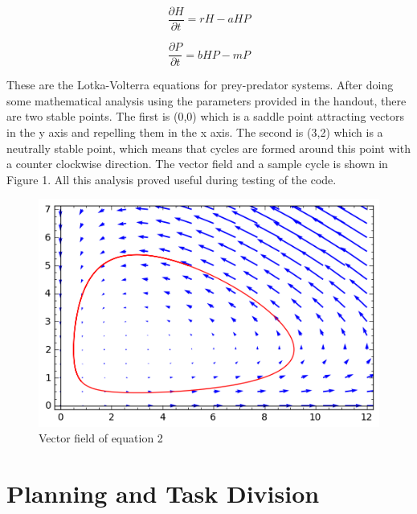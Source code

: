 \documentclass[12pt,a4paper]{article}
\begin{document}
\begin{equation}
\frac{\partial H}{\partial t}=rH-aHP
\end{equation}

\begin{equation}
\frac{\partial P}{\partial t}=bHP-mP
\end{equation}

These are the Lotka-Volterra equations for prey-predator systems. After doing some mathematical analysis using the parameters provided in the handout, there are two stable points. The first is (0,0) which is a saddle point attracting vectors in the y axis and repelling them in the x axis. The second is (3,2) which is a neutrally stable point, which means that cycles are formed around this point with a counter clockwise direction. The vector field and a sample cycle is shown in Figure 1. All this analysis proved useful during testing of the code.  %


\clearpage


\begin{figure}[hb]
    \centering
    \includegraphics[scale=0.75]{images/sage2.png}
    \caption{Vector field of equation 2}
\end{figure}



\section{Planning and Task Division}
\end{document}
